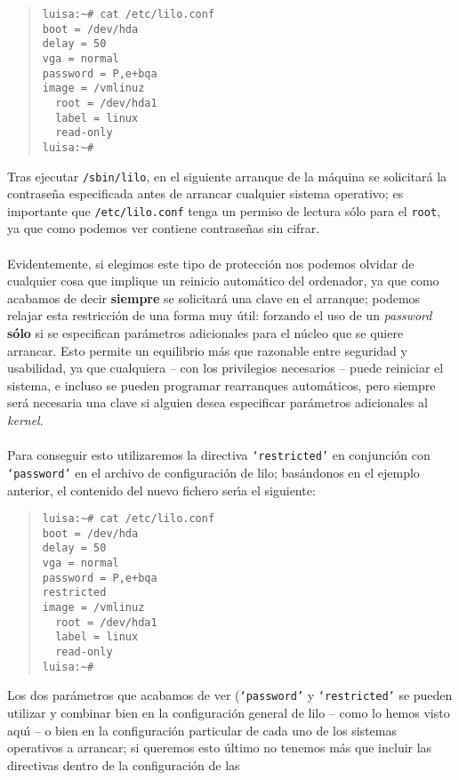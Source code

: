 \begin{quote}
\begin{verbatim}
luisa:~# cat /etc/lilo.conf
boot = /dev/hda
delay = 50
vga = normal
password = P,e+bqa
image = /vmlinuz
  root = /dev/hda1
  label = linux
  read-only 
luisa:~#
\end{verbatim}
\end{quote}
Tras ejecutar {\tt /sbin/lilo}, en el siguiente arranque de la m\'aquina se
solicitar\'a la contrase\~na especificada antes de arrancar cualquier sistema
operativo; es importante que {\tt /etc/lilo.conf} tenga un permiso de lectura
s\'olo para el {\tt root}, ya que como podemos ver contiene contrase\~nas sin
cifrar.\\
\\Evidentemente, si elegimos este tipo de protecci\'on nos podemos olvidar de
cualquier cosa que implique un reinicio autom\'atico del ordenador, ya que
como acabamos de decir {\bf siempre} se solicitar\'a una clave en el arranque;
podemos relajar esta restricci\'on de una forma muy \'util: forzando el uso de 
un {\it password} {\bf s\'olo} si se especifican par\'ametros adicionales para 
el n\'ucleo que se quiere arrancar. Esto permite un equilibrio m\'as que 
razonable entre seguridad y usabilidad, ya que cualquiera -- con los 
privilegios necesarios -- puede reiniciar el sistema, e incluso se pueden 
programar rearranques autom\'aticos, pero siempre ser\'a necesaria una clave si 
alguien desea especificar par\'ametros adicionales al {\it kernel}.\\
\\Para conseguir esto utilizaremos la directiva {\tt `restricted'} en
conjunci\'on con {\tt `password'} en el archivo de configuraci\'on de {\sc 
lilo}; bas\'andonos en el ejemplo anterior, el contenido del nuevo fichero 
ser\'{\i}a el siguiente:
\begin{quote}
\begin{verbatim}
luisa:~# cat /etc/lilo.conf
boot = /dev/hda
delay = 50
vga = normal
password = P,e+bqa
restricted
image = /vmlinuz
  root = /dev/hda1
  label = linux
  read-only
luisa:~#
\end{verbatim}
\end{quote}
Los dos par\'ametros que acabamos de ver ({\tt `password'} y {\tt `restricted'}
se pueden utilizar y combinar bien en la configuraci\'on general de {\sc lilo}
-- como lo hemos visto aqu\'{\i} -- o bien en la configuraci\'on particular de 
cada uno de los sistemas operativos a arrancar; si queremos esto \'ultimo no
tenemos m\'as que incluir las directivas dentro de la configuraci\'on de las
